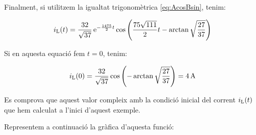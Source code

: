 \begin{exemple}
    Finalment, si utilitzem la igualtat trigonomètrica
    \eqref{eq:AcosBsin}, tenim:

    \[
    i_\mathrm{L}(t) = \frac{32}{\sqrt{37}}\,\mathrm{e}^{-\frac{1475}{2}t}
    \cos\left(\frac{75\sqrt{111}}{2} t - \arctan
    \sqrt{\frac{27}{37}}\right)
    \]

    Si en aquesta equació fem $t=0$, tenim:

    \[
        i_\mathrm{L}(0) = \frac{32}{\sqrt{37}} \cos\left( - \arctan
    \sqrt{\frac{27}{37}}\right) = \SI{4}{A}
    \]

    Es comprova que aquest valor compleix amb la condició inicial del
    corrent $i_\mathrm{L}(t)$ que hem calculat a l'inici d'aquest exemple.

    Representem a continuació la gràfica d'aquesta funció:

    \begin{center}
        
    \end{center}
\end{exemple}


